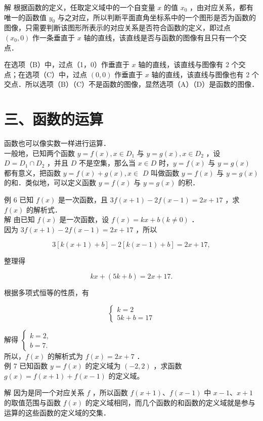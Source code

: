 \documentclass[10pt]{article}
\begin{document}
解 根据函数的定义，任取定义域中的一个自变量 \(x\) 的值 \(x_{0}\) ，由对应关系，都有唯一的函数值 \(y_{0}\) 与之对应，所以判断平面直角坐标系中的一个图形是否为函数的图像，只需要判断该图形所表示的对应关系是否符合函数的定义，即过点 \(\left(x_{0}, 0\right)\) 作一条垂直于 \(x\) 轴的直线，该直线是否与函数的图像有且只有一个交点．

在选项（B）中，过点（1，0）作垂直于 \(x\) 轴的直线，该直线与图像有 2 个交点；在选项（C）中，过点 \((0,0)\) 作垂直于 \(x\) 轴的直线，该直线与图像也有 2 个交点．所以选项（B）（C）不是函数的图像，显然选项（A）（D）是函数的图像．

\section*{三、函数的运算}
函数也可以像实数一样进行运算．\\
一般地，已知两个函数 \(y=f(x), x \in D_{1}\) 与 \(y=g(x), x \in D_{2}\) ，设 \(D=D_{1} \cap D_{2}\) ，并且 \(D\) 不是空集，那么当 \(x \in D\) 时，\(y=f(x)\) 与 \(y=g(x)\) 都有意义，把函数 \(y=f(x)+g(x), x \in\) \(D\) 叫做函数 \(y=f(x)\) 与 \(y=g(x)\) 的和．类似地，可以定义函数 \(y=f(x)\) 与 \(y=g(x)\) 的积．

例 6 已知 \(f(x)\) 是一次函数，且 \(3 f(x+1)-2 f(x-1)=2 x+17\) ，求 \(f(x)\) 的解析式．\\
解 由已知 \(f(x)\) 是一次函数，设 \(f(x)=k x+b(k \neq 0)\) ．\\
因为 \(3 f(x+1)-2 f(x-1)=2 x+17\) ，所以

\[
3[k(x+1)+b]-2[k(x-1)+b]=2 x+17,
\]

整理得

\[
k x+(5 k+b)=2 x+17 .
\]

根据多项式恒等的性质，有

\[
\left\{\begin{array}{l}
k=2 \\
5 k+b=17
\end{array}\right.
\]

解得 \(\left\{\begin{array}{l}k=2, \\ b=7 .\end{array}\right.\)\\
所以，\(f(x)\) 的解析式为 \(f(x)=2 x+7\) ．\\
例 7 已知函数 \(y=f(x)\) 的定义域为 \((-2,2)\) ，求函数 \(g(x)=f(x+1)+f(x-1)\) 的定义域。

解 因为是同一个对应关系 \(f\) ，所以函数 \(f(x+1) 、 f(x-1)\) 中 \(x-1 、 x+1\) 的取值范围与函数 \(f(x)\) 的定义域相同，而几个函数的和函数的定义域就是参与运算的这些函数的定义域的交集．
\end{document}
